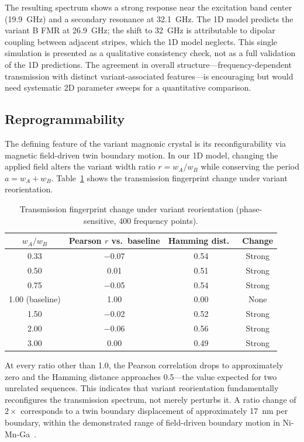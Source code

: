 \documentclass[aip,jap,reprint,floatfix,nofootinbib]{revtex4-2}
\begin{document}
The resulting spectrum shows a strong response near the excitation band center (19.9~GHz) and a secondary resonance at 32.1~GHz. The 1D model predicts the variant B FMR at 26.9~GHz; the shift to 32~GHz is attributable to dipolar coupling between adjacent stripes, which the 1D model neglects. This single simulation is presented as a qualitative consistency check, not as a full validation of the 1D predictions. The agreement in overall structure---frequency-dependent transmission with distinct variant-associated features---is encouraging but would need systematic 2D parameter sweeps for a quantitative comparison.

\subsection{Reprogrammability}
\label{sec:reprogrammability}

The defining feature of the variant magnonic crystal is its reconfigurability via magnetic field-driven twin boundary motion. In our 1D model, changing the applied field alters the variant width ratio $r = w_A/w_B$ while conserving the period $a = w_A + w_B$. Table~\ref{tab:reprogram} shows the transmission fingerprint change under variant reorientation.

\begin{table}[h]
\footnotesize
\caption{Transmission fingerprint change under variant reorientation (phase-sensitive, 400 frequency points).}
\label{tab:reprogram}
\begin{ruledtabular}
\begin{tabular}{cccc}
\toprule
$w_A/w_B$ & Pearson $r$ vs.\ baseline & Hamming dist.\ & Change \\
\midrule
0.33 & $-$0.07 & 0.54 & Strong \\
0.50 & 0.01 & 0.51 & Strong \\
0.75 & $-$0.05 & 0.54 & Strong \\
1.00 (baseline) & 1.00 & 0.00 & None \\
1.50 & $-$0.02 & 0.52 & Strong \\
2.00 & $-$0.06 & 0.56 & Strong \\
3.00 & 0.00 & 0.49 & Strong \\
\bottomrule
\end{tabular}
\end{ruledtabular}
\end{table}

At every ratio other than 1.0, the Pearson correlation drops to approximately zero and the Hamming distance approaches 0.5---the value expected for two unrelated sequences. This indicates that variant reorientation fundamentally reconfigures the transmission spectrum, not merely perturbs it. A ratio change of $2\times$ corresponds to a twin boundary displacement of approximately 17~nm per boundary, within the demonstrated range of field-driven boundary motion in Ni-Mn-Ga~\cite{Heczko2014}.
\end{document}
